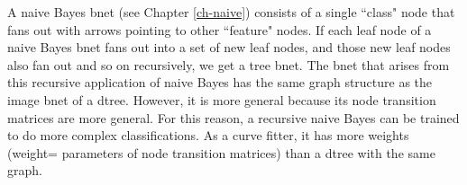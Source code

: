 A naive Bayes bnet 
(see Chapter \ref{ch-naive})
consists of a single ``class"
 node that fans
out with arrows 
pointing to other
``feature" nodes.
If each leaf node
of a naive
Bayes bnet
fans out into 
a set of new leaf
nodes, and those new
leaf nodes
also
fan out
and so on recursively,
we get a 
tree bnet.
The bnet
that arises
from
this recursive
application
of naive Bayes
has the same graph structure
as the image bnet of a dtree.
However, it is more
general because its node
transition matrices are more general. For
this reason, a recursive
naive Bayes
can be trained to
do more complex classifications.
As a curve fitter, it has more
weights (weight=
parameters of node
transition matrices) than a dtree
with the same graph.
